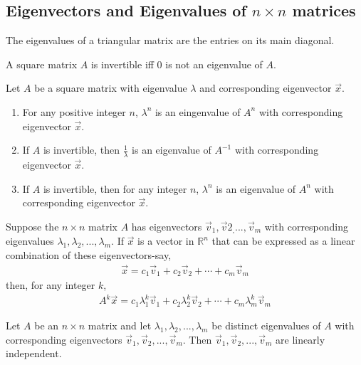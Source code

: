 \documentclass{article}
\begin{document}
\subsection{Eigenvectors and Eigenvalues of $n\times n$ matrices}
\setcounter{theorem}{14}
\begin{theorem}
    The eigenvalues of a triangular matrix are the entries on its main diagonal.
\end{theorem}
\begin{theorem}
    A square matrix $A$ is invertible iff $0$ is not an eigenvalue of $A$.
\end{theorem}
\setcounter{theorem}{17}
\begin{theorem}
    Let $A$ be a square matrix with eigenvalue $\lambda$ and corresponding eigenvector $\vec x$.
    \begin{enumerate}
        \item For any positive integer $n$, $\lambda^n$ is an eingenvalue of $A^n$ with corresponding eigenvector $\vec x$.
        \item If $A$ is invertible, then $\frac{1}{\lambda}$ is an eigenvalue of $A^{-1}$ with corresponding eigenvector $\vec x$.
        \item If $A$ is invertible, then for any integer $n$, $\lambda^n$ is an eigenvalue of $A^n$ with corresponding eigenvector $\vec x$.
    \end{enumerate}
\end{theorem}
\begin{theorem}
    Suppose the $n\times n$ matrix $A$ has eigenvectors $\vec v_1, \vec v2_, ..., \vec v_m$ with corresponding eigenvalues $\lambda_1, \lambda_2, ...,\lambda_m$. If $\vec x$ is a vector in $\mathbb{R}^n$ that can be expressed as a linear combination of these eigenvectors-say,
    \begin{align*}
        \vec x = c_1\vec v_1+c_2\vec v_2 +\cdots + c_m\vec v_m
    \end{align*}
    then, for any integer $k$,
    \begin{align*}
        A^k\vec x = c_1\lambda_1^k\vec v_1+c_2\lambda_2^k\vec v_2 + \cdots + c_m\lambda_m^k\vec v_m
    \end{align*}
\end{theorem}
\begin{theorem}
    Let $A$ be an $n\times n$ matrix and let $\lambda_1, \lambda_2, ...,\lambda_m$ be distinct eigenvalues of $A$ with corresponding eigenvectors $\vec v_1, \vec v_2, ..., \vec v_m$. Then $\vec v_1, \vec v_2, ...,\vec v_m$ are linearly independent.
\end{theorem}
\end{document}
